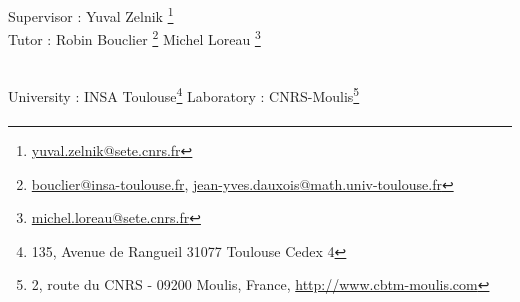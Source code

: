 \documentclass{article}
\begin{document}
\begin{titlepage}

\vspace*{3cm}

\begin{flushleft}
\hfill 
Supervisor : Yuval Zelnik \footnote{\url{yuval.zelnik@sete.cnrs.fr}} \\
Tutor : Robin Bouclier \footnote{\url{bouclier@insa-toulouse.fr}, \url{jean-yves.dauxois@math.univ-toulouse.fr}}  \hfill 
Michel Loreau \footnote{\url{michel.loreau@sete.cnrs.fr}}

 \\
University : INSA Toulouse\footnote{135, Avenue de Rangueil 31077 Toulouse Cedex 4} \hfill
Laboratory : CNRS-Moulis\footnote{2, route du CNRS - 09200 Moulis, France, \url{http://www.cbtm-moulis.com}} \\
\end{flushleft}

\end{titlepage}



\newpage
\addto\captionsfrench{\def\contentsname{}} %

\paragraph{}


\tableofcontents



\newpage
\listoffigures



\newpage
{}
\end{document}

